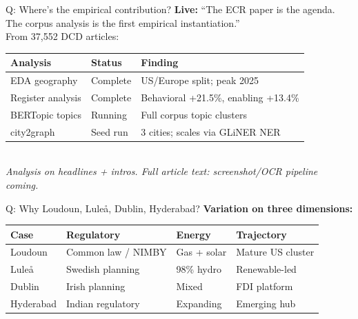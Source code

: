 \documentclass[aspectratio=169,11pt]{beamer}
\begin{document}
\begin{frame}[noframenumbering]{\enspace Q: Where's the empirical contribution?}
\footnotesize
\textbf{Live:} ``The ECR paper is the agenda. The corpus analysis is the first empirical instantiation.''\\[0.5em]
From 37,552 DCD articles:\\[0.3em]
\begin{tabular}{@{}lll@{}}
\toprule
\textbf{Analysis} & \textbf{Status} & \textbf{Finding} \\
\midrule
EDA geography     & Complete  & US/Europe split; peak 2025 \\
Register analysis & Complete  & Behavioral +21.5\%, enabling +13.4\% \\
BERTopic topics   & Running   & Full corpus topic clusters \\
city2graph        & Seed run  & 3 cities; scales via GLiNER NER \\
\bottomrule
\end{tabular}\\[0.3em]
\textcolor{dcgray}{\textit{Analysis on headlines + intros. Full article text: screenshot/OCR pipeline coming.}}
\end{frame}

\begin{frame}[noframenumbering]{\enspace Q: Why Loudoun, Luleå, Dublin, Hyderabad?}
\footnotesize
\textbf{Variation on three dimensions:}\\[0.4em]
\begin{tabular}{@{}llll@{}}
\toprule
\textbf{Case} & \textbf{Regulatory} & \textbf{Energy} & \textbf{Trajectory} \\
\midrule
Loudoun    & Common law / NIMBY  & Gas + solar  & Mature US cluster \\
Lule\aa    & Swedish planning    & 98\% hydro   & Renewable-led \\
Dublin     & Irish planning      & Mixed        & FDI platform \\
Hyderabad  & Indian regulatory   & Expanding    & Emerging hub \\
\bottomrule
\end{tabular}
\end{frame}
\end{document}
